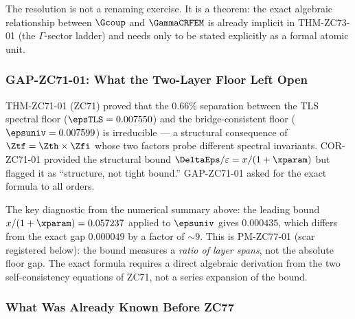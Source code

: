 \documentclass[12pt, a4paper]{article}
\begin{document}
The resolution is not a renaming exercise. It is a theorem: the exact
algebraic relationship between $\Gcoup$ and $\GammaCRFEM$ is already
implicit in THM-ZC73-01 (the $\Gamma$-sector ladder) and needs only to be
stated explicitly as a formal atomic unit.

\subsubsection{GAP-ZC71-01: What the Two-Layer Floor Left Open}

THM-ZC71-01 (ZC71) proved that the $0.66\%$ separation between the TLS
spectral floor ($\epsTLS = 0.007550$) and the bridge-consistent floor
($\epsuniv = 0.007599$) is irreducible --- a structural consequence of
$\Ztf = \Zth\times\Zfi$ whose two factors probe different spectral
invariants. COR-ZC71-01 provided the structural bound
$\DeltaEps/\varepsilon = x/(1+\xparam)$ but flagged it as ``structure,
not tight bound.'' GAP-ZC71-01 asked for the exact formula to all orders.

The key diagnostic from the numerical summary above: the leading bound
$x/(1+\xparam) = 0.057237$ applied to $\epsuniv$ gives $0.000435$, which
differs from the exact gap $0.000049$ by a factor of $\sim 9$. This is
PM-ZC77-01 (scar registered below): the bound measures a \emph{ratio of
layer spans}, not the absolute floor gap. The exact formula requires
a direct algebraic derivation from the two self-consistency equations of
ZC71, not a series expansion of the bound.

\subsubsection{What Was Already Known Before ZC77}
\end{document}
